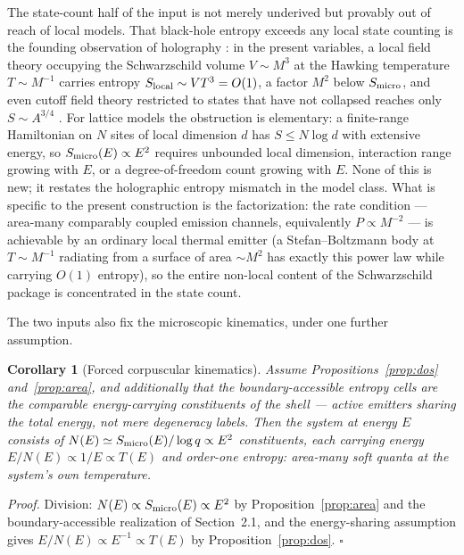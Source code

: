 \documentclass[12pt]{article}
\newcommand{\Smicro}{S_{\rm micro}}
\newtheorem{corollary}{Corollary}
\begin{document}
The state-count half of the input is not merely underived but provably out
of reach of local models.  That black-hole entropy exceeds any local state
counting is the founding observation of holography
\cite{Bekenstein1981,tHooft1993,Susskind1995,Bousso2002}: in the present
variables, a local field theory occupying the Schwarzschild volume
$V\sim M^3$ at the Hawking temperature $T\sim M^{-1}$ carries entropy
$S_{\rm local}\sim VT^3=O(1)$, a factor $M^2$ below $\Smicro$, and even
cutoff field theory restricted to states that have not collapsed reaches
only $S\sim A^{3/4}$ \cite{CohenKaplanNelson1999,Yurtsever2003}.  For
lattice models the obstruction is elementary: a finite-range Hamiltonian on
$N$ sites of local dimension $d$ has $S\le N\log d$ with extensive energy,
so $\Smicro(E)\propto E^2$ requires unbounded local dimension, interaction
range growing with $E$, or a degree-of-freedom count growing with $E$.
None of this is new; it restates the holographic entropy mismatch in the
model class.  What is specific to the present construction is the
factorization: the rate condition --- area-many comparably coupled emission
channels, equivalently $P\propto M^{-2}$ --- is achievable by an ordinary
local thermal emitter (a Stefan--Boltzmann body at $T\sim M^{-1}$ radiating
from a surface of area $\sim M^2$ has exactly this power law while carrying
$O(1)$ entropy), so the entire non-local content of the Schwarzschild
package is concentrated in the state count.

The two inputs also fix the microscopic kinematics, under one further
assumption.

\begin{corollary}[Forced corpuscular kinematics]
\label{cor:corpuscular}
Assume Propositions~\ref{prop:dos} and~\ref{prop:area}, and additionally
that the boundary-accessible entropy cells are the comparable
energy-carrying constituents of the shell --- active emitters sharing
the total energy, not mere degeneracy labels.  Then the system at energy
$E$ consists of $N(E)\simeq\Smicro(E)/\log q\propto E^2$ constituents,
each carrying energy $E/N(E)\propto 1/E\propto T(E)$ and order-one
entropy: area-many soft quanta at the system's own temperature.
\end{corollary}

\emph{Proof.}  Division: $N(E)\propto\Smicro(E)\propto E^2$ by
Proposition~\ref{prop:area} and the boundary-accessible realization of
Section~2.1, and the energy-sharing assumption gives
$E/N(E)\propto E^{-1}\propto T(E)$ by Proposition~\ref{prop:dos}.
\hfill$\square$
\end{document}
